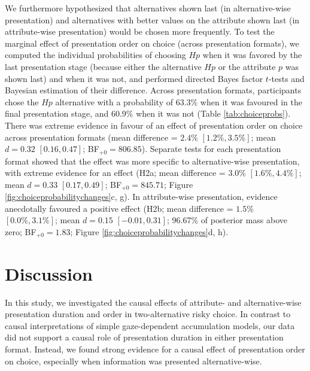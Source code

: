 \documentclass[11pt, a4paper, twocolumn, abstract]{scrartcl}
\begin{document}
We furthermore hypothesized that alternatives shown last (in alternative-wise presentation) and alternatives with better values on the attribute shown last (in attribute-wise presentation) would be chosen more frequently. 
To test the marginal effect of presentation order on choice (across presentation formats), we computed the individual probabilities of choosing $Hp$ when it was favored by the last presentation stage (because either the alternative $Hp$ or the attribute $p$ was shown last) and when it was not, and performed directed Bayes factor $t$-tests and Bayesian estimation of their difference. 
Across presentation formats, participants chose the $Hp$ alternative with a probability of 63.3\% when it was favoured in the final presentation stage, and 60.9\% when it was not (Table \ref{tab:choiceprobs}).
There was extreme evidence in favour of an effect of presentation order on choice across presentation formats (mean difference = $2.4\%$ $[1.2\%, 3.5\%]$; mean $d = 0.32$ $[0.16, 0.47]$; BF$_{{+}0} = 806.85$). 
Separate tests for each presentation format showed that the effect was more specific to alternative-wise presentation, with extreme evidence for an effect (H2a; mean difference = $3.0\%$ $[1.6\%, 4.4\%]$; mean $d = 0.33$ $[0.17, 0.49]$; BF$_{{+}0} = 845.71$; Figure \ref{fig:choiceprobabilitychanges}c, g). In attribute-wise presentation, evidence anecdotally favoured a positive effect (H2b; mean difference = $1.5\%$ $[0.0\%, 3.1\%]$; mean $d = 0.15$ $[-0.01, 0.31]$; 96.67\% of posterior mass above zero; BF$_{{+}0} = 1.83$; Figure \ref{fig:choiceprobabilitychanges}d, h).


\section*{Discussion}

In this study, we investigated the causal effects of attribute- and alternative-wise presentation duration and order in two-alternative risky choice. In contrast to causal interpretations of simple gaze-dependent accumulation models, our data did not support a causal role of presentation duration in either presentation format. Instead, we found strong evidence for a causal effect of presentation order on choice, especially when information was presented alternative-wise.

\end{document}
